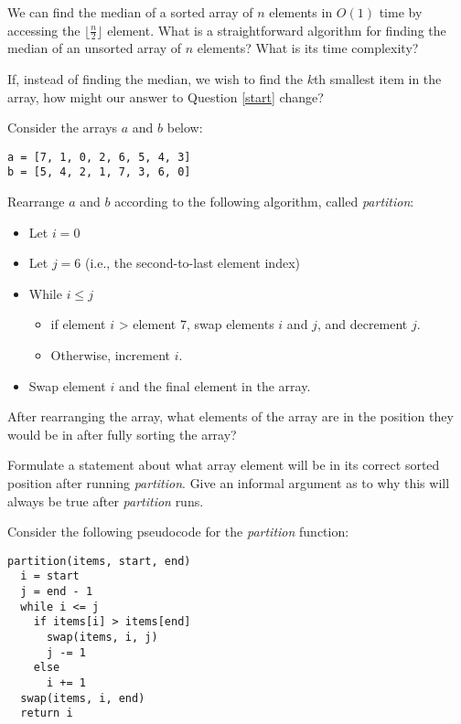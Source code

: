 \documentclass{tufte-handout}
\begin{document}
\begin{questions}
\item We can find the median of a sorted array of $n$ elements in $O(1)$ time by accessing the $\lfloor \frac{n}{2} \rfloor$ element. What is a straightforward algorithm for  finding the median of an unsorted array of $n$ elements? What is its time complexity? \label{start}

\item If, instead of finding the median, we wish to find the $k$th smallest item in the array, how might our answer to Question \ref{start} change?

\item Consider the arrays $a$ and $b$ below:

\begin{verbatim}
a = [7, 1, 0, 2, 6, 5, 4, 3]
b = [5, 4, 2, 1, 7, 3, 6, 0]
\end{verbatim}

Rearrange $a$ and $b$ according to the following algorithm, called \emph{partition}:
\begin{itemize}
    \item Let $i = 0$
    \item Let $j = 6$ (i.e., the second-to-last element index)
    \item While $i \le j$
    \begin{itemize}
        \item if element $i$ > element $7$, swap elements $i$ and $j$, and decrement $j$.
        \item Otherwise, increment $i$.
    \end{itemize}
    \item Swap element $i$ and the final element in the array.
\end{itemize}

\item After rearranging the array, what elements of the array are in the position they would be in after fully sorting the array?

\item Formulate a statement about what array element will be in its correct sorted position after running \emph{partition}. Give an informal argument as to why this will always be true after  \emph{partition} runs.

\item Consider the following pseudocode for the \emph{partition} function:
\begin{verbatim}
partition(items, start, end)
  i = start
  j = end - 1
  while i <= j
    if items[i] > items[end]
      swap(items, i, j)
      j -= 1
    else
      i += 1
  swap(items, i, end)
  return i
\end{verbatim}


\end{questions}
\end{document}
